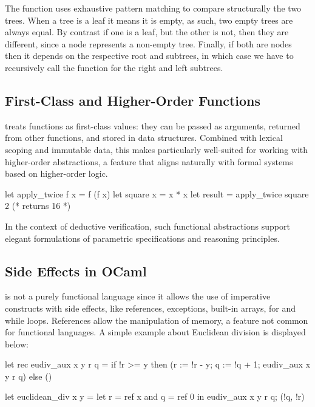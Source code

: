 The function  uses exhaustive pattern matching to compare structurally the two trees. When a tree is a leaf it means it is
empty, as such, two empty trees are always equal. By contrast if one is a leaf, but the other is not, then they are different, since
a node represents a non-empty tree. Finally, if both are nodes then it depends on the respective root and subtrees, in which case we have to 
recursively call the function  for the right and left subtrees.

\subsection{First-Class and Higher-Order Functions}

\ocaml treats functions as first-class values: they can be passed as arguments, returned from other functions, 
and stored in data structures. Combined with lexical scoping and immutable data, this makes \ocaml particularly 
well-suited for working with higher-order abstractions, a feature that aligns naturally with formal systems based on 
higher-order logic.

\begin{ocamlenv}
  let apply_twice f x = f (f x)
  let square x = x * x
  let result = apply_twice square 2  (* returns 16 *)
\end{ocamlenv}

In the context of deductive verification, such functional abstractions support elegant formulations of parametric specifications 
and reasoning principles.

\subsection{Side Effects in OCaml}
\label{subsec:SideEffects}

\ocaml is not a purely functional language since it allows the use of imperative constructs with side effects, like references,
exceptions, built-in arrays, for and while loops. References allow the manipulation of memory, a feature not common for functional
languages. A simple example about Euclidean division is displayed below:

\begin{ocamlenv}
let rec eudiv_aux x y r q =
  if !r >= y then (r := !r - y; q := !q + 1; eudiv_aux x y r q)
  else ()

let euclidean_div x y =
    let r = ref x and q = ref 0 in 
  eudiv_aux x y r q;
  (!q, !r)
\end{ocamlenv}

